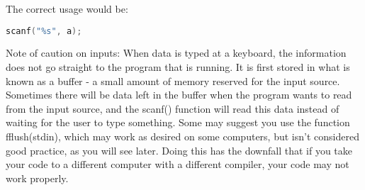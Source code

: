 The correct usage would be:
\lstset{basicstyle=\scriptsize, numbers=left, captionpos=b, tabsize=4}
\begin{lstlisting}[caption=Section \thesection listing \arabic{inout},language={C},
breaklines=true,xleftmargin=15pt,label=lst:section\thesection listing\arabic{inout}]
scanf("%s", a);
\end{lstlisting}
Note of caution on inputs: When data is typed at a keyboard, the information
does not go straight to the program that is running. It is first stored in what
is known as a buffer - a small amount of memory reserved for the input source.
Sometimes there will be data left in the buffer when the program wants to read
from the input source, and the scanf() function will read this data instead of
waiting for the user to type something. Some may suggest you use the function
fflush(stdin), which may work as desired on some computers, but isn't
considered good practice, as you will see later. Doing this has the downfall
that if you take your code to a different computer with a different compiler,
your code may not work properly.
